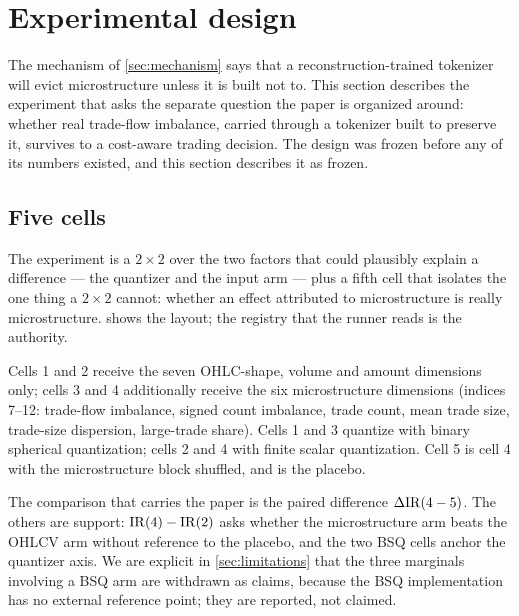 \section{Experimental design}
\label{sec:setup}

The mechanism of \cref{sec:mechanism} says that a reconstruction-trained tokenizer will evict
microstructure unless it is built not to. This section describes the experiment that asks the
separate question the paper is organized around: whether real trade-flow imbalance, carried through
a tokenizer built to preserve it, survives to a cost-aware trading decision. The design was frozen
before any of its numbers existed, and this section describes it as frozen.

\subsection{Five cells}
\label{sec:cells}

The experiment is a $2\times2$ over the two factors that could plausibly explain a difference ---
the quantizer and the input arm --- plus a fifth cell that isolates the one thing a $2\times2$
cannot: whether an effect attributed to microstructure is really microstructure.
 shows the layout; the registry that the runner reads is the authority.

Cells 1 and 2 receive the seven OHLC-shape, volume and amount dimensions only; cells 3 and 4
additionally receive the six microstructure dimensions (indices 7--12: trade-flow imbalance,
signed count imbalance, trade count, mean trade size, trade-size dispersion, large-trade share).
Cells 1 and 3 quantize with binary spherical quantization; cells 2 and 4 with finite scalar
quantization. Cell 5 is cell 4 with the microstructure block shuffled, and is the placebo.

The comparison that carries the paper is the paired difference $\Delta\mathrm{IR}(4-5)$. The others are
support: $\mathrm{IR}(4)-\mathrm{IR}(2)$ asks whether the microstructure arm beats the OHLCV arm without reference
to the placebo, and the two BSQ cells anchor the quantizer axis. We are explicit in
\cref{sec:limitations} that the three marginals involving a BSQ arm are withdrawn as claims,
because the BSQ implementation has no external reference point; they are reported, not claimed.


